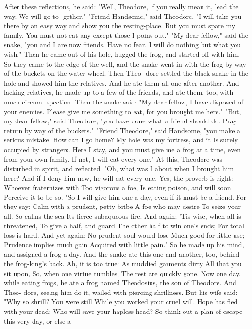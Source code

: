 \documentclass{book}
\begin{document}
After these reflections, he said: "Well, Theodore,
if you really mean it, lead the way. We will go to-
gether." "Friend Handsome," said Theodore, "I
will take you there by an easy way and show you the
resting-place. But you must spare my family. You
must not eat any except those I point out."
"My dear fellow," said the snake, "you and I are
now friends. Have no fear. I will do nothing but
what you wish."
Then he came out of his hole, hugged the frog,
and started off with him. So they came to the edge
of the well, and the snake went in with the frog by
way of the buckets on the water-wheel. Then Theo-
dore settled the black snake in the hole and showed
him the relatives. And he ate them all one after
another. And lacking relatives, he made up to a few
of the friends, and ate them, too, with much circum-
spection.
Then the snake said: "My dear fellow, I have
disposed of your enemies. Please give me something
to eat, for you brought me here."
"But, my dear fellow," said Theodore, "you have
done what a friend should do. Pray return by way of
the buckets."
"Friend Theodore," said Handsome, "you make a
serious mistake. How can I go home? My hole was
my fortress, and it Is surely occupied by strangers.
Here I stay, and you must give me a frog at a time,
even from your own family. If not, I will eat every
one."
At this, Theodore was disturbed in spirit, and
reflected: "Oh, what was I about when I brought
him here? And if I deny him now, he will eat every
one. Yes, the proverb is right:
Whoever fraternizes with
Too vigorous a foe,
Is eating poison, and will soon
Perceive it to be so.
"So I will give him one a day, even if it must be a
friend. For they say:
Calm with a prudent, petty bribe
A foe who may desire
To seize your all. So calms the sea
Its fierce subaqueous fire.
And again:
'Tis wise, when all is threatened,
To give a half, and guard
The other half to win one's ends;
For total loss is hard.
And yet again:
No prudent soul would lose
Much good for little use;
Prudence implies much gain
Acquired with little pain."
So he made up his mind, and assigned a frog a day.
And the snake ate this one and another, too, behind
the frog-king's back. Ah, it is too true:
As muddied garments dirty
All that you sit upon,
So, when one virtue tumbles,
The rest are quickly gone.
Now one day, while eating frogs, he ate a frog
named Theodosius, the son of Theodore. And Theo-
dore, seeing him do it, wailed with piercing shrillness.
But his wife said:
"Why so shrill? You were still
While you worked your cruel will.
Hope has fled with your dead;
Who will save your hapless head?
So think out a plan of escape this very day, or else a
\end{document}
